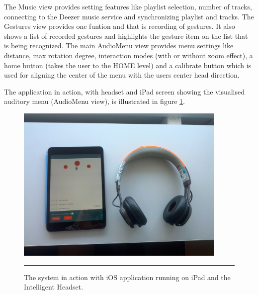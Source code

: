 The Music view provides setting features like playlist selection, number of tracks, connecting to the Deezer music service and synchronizing playlist and tracks. The Gestures view provides one funtion and that is recording of gestures. It also shows a list of recorded gestures and highlights the gesture item on the list that is being recognized. The main AudioMenu view provides menu settings like distance, max rotation degree, interaction modes (with or without zoom effect), a home button (takes the user to the HOME level) and a calibrate button which is used for aligning the center of the menu with the users center head direction.

\newpage

The application in action, with headset and iPad screen showing the visualised auditory menu (AudioMenu view), is illustrated in figure \ref{fig:implementationsystem}.

\begin{figure}[h]
  \centering
    \includegraphics[width=0.9\textwidth,height=\textheight,keepaspectratio]{./Figures/system_final.jpg}
    \rule{35em}{1pt}
  \caption[Final system in action]{The system in action with iOS application running on iPad and the Intelligent Headset.}
  \label{fig:implementationsystem}
\end{figure}







